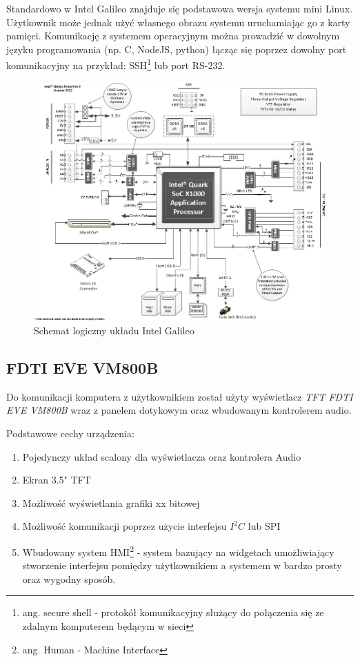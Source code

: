 \documentclass{xmgr}
\begin{document}
Standardowo w Intel Galileo znajduje się podstawowa wersja systemu mini Linux. Użytkownik może jednak użyć własnego obrazu systemu uruchamiając go z karty pamięci. Komunikację z systemem operacyjnym można prowadzić w dowolnym języku programowania (np. C, NodeJS, python) łącząc się poprzez dowolny port komunikacyjny na przykład: SSH\footnote{ang. secure shell - protokół komunikacyjny służący do połączenia się ze zdalnym komputerem będącym w sieci} lub port RS-232.

\begin{figure}[!h]
    \centering
    \includegraphics[height=0.6\textwidth]{images/IntelGalileoLogicSchematics.jpg}
    \caption{Schemat logiczny układu Intel Galileo\label{IntelGalileoLogicSchematics}}
\end{figure}

\subsection{FDTI EVE VM800B}
Do komunikacji komputera z użytkownikiem został użyty wyświetlacz \emph{TFT FDTI EVE VM800B} wraz z panelem dotykowym oraz wbudowanym kontrolerem audio. 

Podstawowe cechy urządzenia\cite{FTDI}:
\begin{enumerate}
	\item Pojedynczy układ scalony dla wyświetlacza oraz kontrolera Audio
	\item Ekran 3.5" TFT
	\item Możliwość wyświetlania grafiki xx bitowej
	\item Możliwość komunikacji poprzez użycie interfejsu $I^2C$ lub SPI
	\item Wbudowany system HMI\footnote{ang. Human - Machine Interface} - system bazujący na widgetach umożliwiający stworzenie interfejsu pomiędzy użytkownikiem a systemem w bardzo prosty oraz wygodny sposób.
\end{enumerate}
\end{document}
